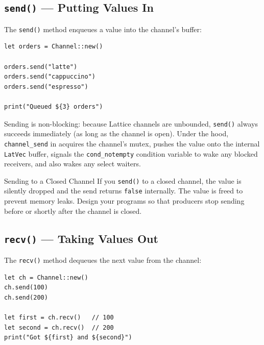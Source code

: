\subsection{\texttt{send()} --- Putting Values In}


The \lstinline|send()| method enqueues a value into the channel's buffer:

\begin{lstlisting}[language=Lattice, caption={Sending values}]
let orders = Channel::new()

orders.send("latte")
orders.send("cappuccino")
orders.send("espresso")

print("Queued ${3} orders")
\end{lstlisting}

Sending is non-blocking: because Lattice channels are unbounded, \lstinline|send()| always succeeds immediately (as long as the channel is open).
Under the hood, \texttt{channel\_send} in  acquires the channel's mutex, pushes the value onto the internal \texttt{LatVec} buffer, signals the \texttt{cond\_notempty} condition variable to wake any blocked receivers, and also wakes any select waiters.

\begin{notebox}{Sending to a Closed Channel}
If you \lstinline|send()| to a closed channel, the value is silently dropped and the send returns \lstinline|false| internally.
The value is freed to prevent memory leaks.
Design your programs so that producers stop sending before or shortly after the channel is closed.
\end{notebox}

\subsection{\texttt{recv()} --- Taking Values Out}


The \lstinline|recv()| method dequeues the next value from the channel:

\begin{lstlisting}[language=Lattice, caption={Receiving values}]
let ch = Channel::new()
ch.send(100)
ch.send(200)

let first = ch.recv()   // 100
let second = ch.recv()  // 200
print("Got ${first} and ${second}")
\end{lstlisting}

